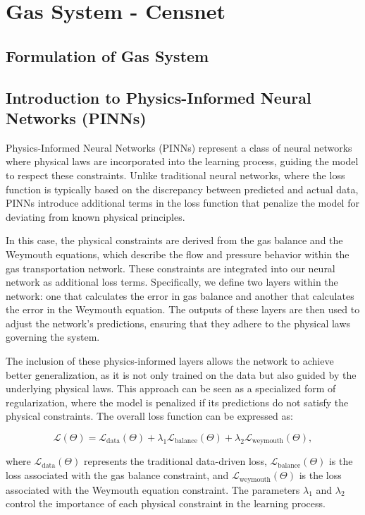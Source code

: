\chapter{Gas System - Censnet} \label{cap:mpcc}

\section{Formulation of Gas System} \label{sec:formulation}


\section{Introduction to Physics-Informed Neural Networks (PINNs)}

Physics-Informed Neural Networks (PINNs) represent a class of neural networks where physical laws are incorporated into the learning process, guiding the model to respect these constraints. Unlike traditional neural networks, where the loss function is typically based on the discrepancy between predicted and actual data, PINNs introduce additional terms in the loss function that penalize the model for deviating from known physical principles.

In this case, the physical constraints are derived from the gas balance and the Weymouth equations, which describe the flow and pressure behavior within the gas transportation network. These constraints are integrated into our neural network as additional loss terms. Specifically, we define two layers within the network: one that calculates the error in gas balance and another that calculates the error in the Weymouth equation. The outputs of these layers are then used to adjust the network's predictions, ensuring that they adhere to the physical laws governing the system.

The inclusion of these physics-informed layers allows the network to achieve better generalization, as it is not only trained on the data but also guided by the underlying physical laws. This approach can be seen as a specialized form of regularization, where the model is penalized if its predictions do not satisfy the physical constraints. The overall loss function can be expressed as:


\[
\mathcal{L}(\Theta) = \mathcal{L}_{\text{data}}(\Theta) + \lambda_1 \mathcal{L}_{\text{balance}}(\Theta) + \lambda_2 \mathcal{L}_{\text{weymouth}}(\Theta),
\]

where \( \mathcal{L}_{\text{data}}(\Theta) \) represents the traditional data-driven loss, \( \mathcal{L}_{\text{balance}}(\Theta) \) is the loss associated with the gas balance constraint, and \( \mathcal{L}_{\text{weymouth}}(\Theta) \) is the loss associated with the Weymouth equation constraint. The parameters \( \lambda_1 \) and \( \lambda_2 \) control the importance of each physical constraint in the learning process.


